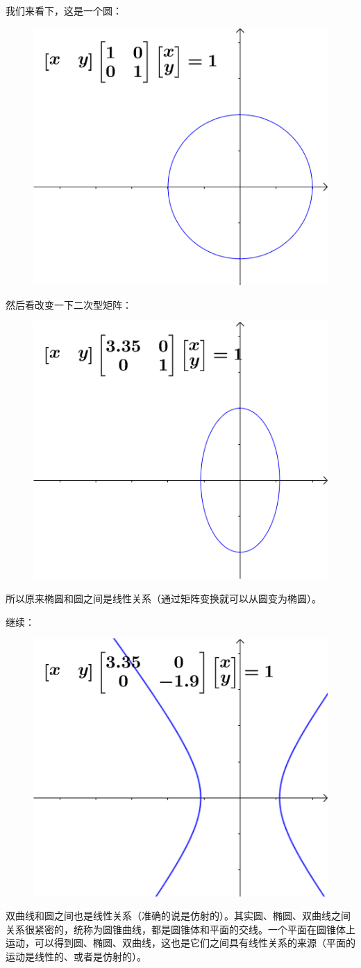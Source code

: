\documentclass[12pt]{article}
\begin{document}
我们来看下，这是一个圆：
\begin{figure}[H]
    \centering
    \includegraphics[width=.5\textwidth]{fig/UnderstandQuadraticForm_3.png}
\end{figure} 

然后看改变一下二次型矩阵：
\begin{figure}[H]
    \centering
    \includegraphics[width=.5\textwidth]{fig/UnderstandQuadraticForm_4.png}
\end{figure} 

所以原来椭圆和圆之间是线性关系（通过矩阵变换就可以从圆变为椭圆）。

继续：
\begin{figure}[H]
    \centering
    \includegraphics[width=.5\textwidth]{fig/UnderstandQuadraticForm_5.png}
\end{figure} 
双曲线和圆之间也是线性关系（准确的说是仿射的）。其实圆、椭圆、双曲线之间关系很紧密的，统称为圆锥曲线，都是圆锥体和平面的交线。一个平面在圆锥体上运动，可以得到圆、椭圆、双曲线，这也是它们之间具有线性关系的来源（平面的运动是线性的、或者是仿射的）。
\end{document}
